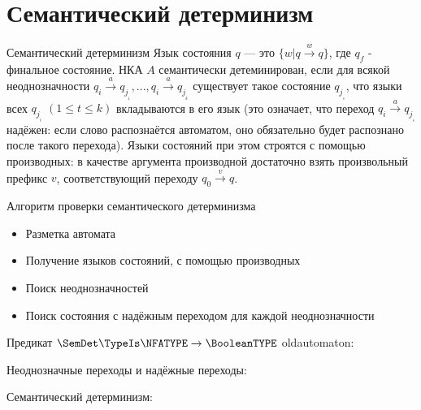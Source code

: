 \section{Семантический детерминизм}
\begin{frame}{Семантический детерминизм}
    \vspace{-5pt}
     Язык состояния $q$ — это $\{w | q \xrightarrow{\text{$w$}} q\}$, где $q_f$  - финальное состояние. НКА $A$ семантически детеминирован, если для всякой неоднозначности $q_i \xrightarrow{\text{$a$}} {q_j__1} , ..., {q_i \xrightarrow{\text{$a$}} q_j__k}$ существует такое состояние $q_j__s$, что языки всех  $q_j__t$ $(1 \leqslant t \leqslant k)$ вкладываются в его язык (это означает, что переход $q_i \xrightarrow{\text{$a$}} {q_j__s}$ надёжен: если слово распознаётся автоматом, оно обязательно будет распознано после такого перехода).
     Языки состояний при этом строятся с помощью производных: в качестве аргумента производной достаточно взять произвольный префикс $v$, соответствующий переходу $q_0 \xrightarrow{\text{$v$}} q$.
\end{frame} %
\begin{frame}{Алгоритм проверки семантического детерминизма}
    \vspace{-5pt}
    \begin{itemize}
        \item Разметка автомата
        \item Получение языков состояний, с помощью производных
        \item Поиск неоднозначностей
        \item Поиск состояния с надёжным переходом для каждой неоднозначности
    \end{itemize}
    
\end{frame}
\begin{frame}{Предикат $\SemDet\TypeIs\NFATYPE\to\BooleanTYPE$}
    \vspace{-5pt}
	oldautomaton:


    Неоднозначные переходы и надёжные переходы:



    Семантический детерминизм:

\end{frame}
